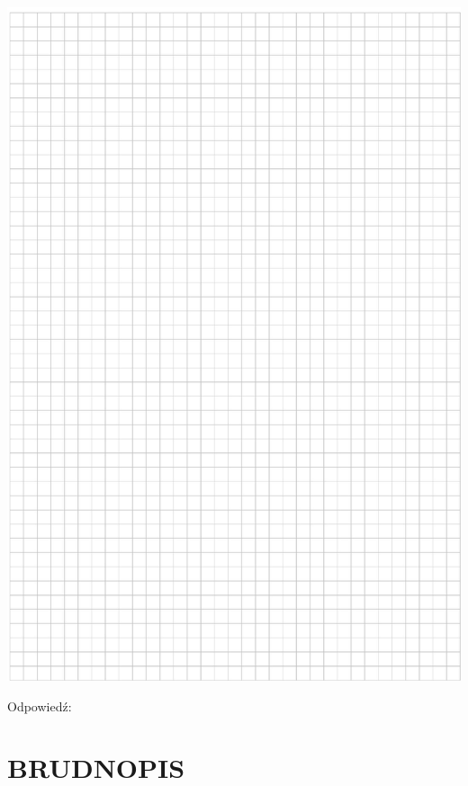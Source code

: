 \documentclass[10pt]{article}
\begin{document}
\includegraphics[max width=\textwidth, center]{2024_11_21_d9af6ed2d610d3f2d2cbg-19}

Odpowiedź:

\section*{BRUDNOPIS}
\end{document}
